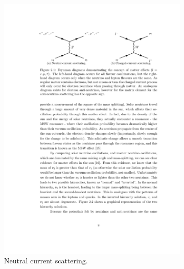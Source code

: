 \begin{figure}
  \centering
  \begin{subfigure}{0.48\linewidth}
    \centering
    \includegraphics{MatterEffectsNC.pdf}
    \caption{Neutral current scattering.}
    \label{fig:MatterEffectsNC}
  \end{subfigure}
  \hfill
  \begin{subfigure}{0.48\linewidth}
    \centering

\end{subfigure}
\end{figure}
